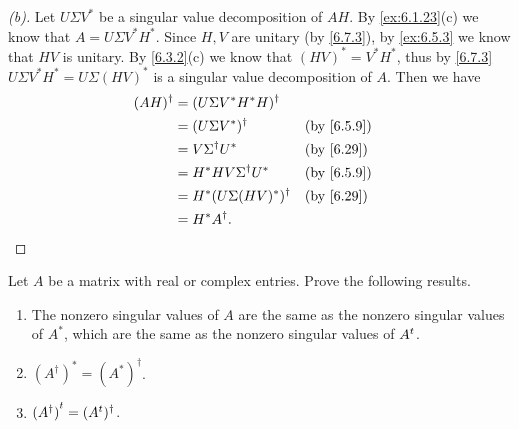 \begin{proof}[(b)]
  Let \(U \Sigma V^*\) be a singular value decomposition of \(AH\).
  By \cref{ex:6.1.23}(c) we know that \(A = U \Sigma V^* H^*\).
  Since \(H, V\) are unitary (by \cref{6.7.3}), by \cref{ex:6.5.3} we know that \(HV\) is unitary.
  By \cref{6.3.2}(c) we know that \((HV)^* = V^* H^*\), thus by \cref{6.7.3} \(U \Sigma V^* H^* = U \Sigma (HV)^*\) is a singular value decomposition of \(A\).
  Then we have
  \begin{align*}
    (AH)^{\dag} & = (U \Sigma V^* H^* H)^{\dag}                  \\
                & = (U \Sigma V^*)^{\dag}        &  & \by{6.5.9} \\
                & = V \Sigma^{\dag} U^*          &  & \by{6.29}  \\
                & = H^* H V \Sigma^{\dag} U^*    &  & \by{6.5.9} \\
                & = H^* (U \Sigma (HV)^*)^{\dag} &  & \by{6.29}  \\
                & = H^* A^{\dag}.
  \end{align*}
\end{proof}

\begin{ex}\label{ex:6.7.19}
  Let \(A\) be a matrix with real or complex entries.
  Prove the following results.
  \begin{enumerate}
    \item The nonzero singular values of \(A\) are the same as the nonzero singular values of \(A^*\), which are the same as the nonzero singular values of \({A}^{t}\).
    \item \((A^{\dag})^* = (A^*)^{\dag}\).
    \item \({(A^{\dag})}^{t} = ({A}^{t})^{\dag}\).
  \end{enumerate}
\end{ex}

